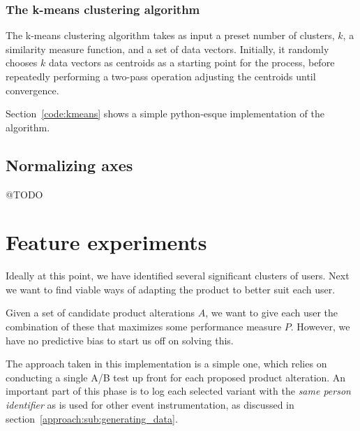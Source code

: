 \subsubsection{The k-means clustering algorithm}
\label{subs:kmeans}

The k-means clustering algorithm takes as input a preset number of clusters, $k$, a similarity measure function, and a set of data vectors. Initially, it randomly chooses $k$ data vectors as centroids as a starting point for the process, before repeatedly performing a two-pass operation adjusting the centroids until convergence.

Section~\ref{code:kmeans} shows a simple python-esque implementation of the algorithm.

%
%

\subsection{Normalizing axes}
\label{approach:sub:normalizing_axes}

@TODO

\section{Feature experiments}
\label{approach:sec:feature_experiments}

Ideally at this point, we have identified several significant clusters of users. Next we want to find viable ways of adapting the product to better suit each user.

Given a set of candidate product alterations $A$, we want to give each user the combination of these that maximizes some performance measure $P$. However, we have no predictive bias to start us off on solving this.

The approach taken in this implementation is a simple one, which relies on conducting a single A/B test up front for each proposed product alteration. An important part of this phase is to log each selected variant with the \emph{same person identifier} as is used for other event instrumentation, as discussed in section~\ref{approach:sub:generating_data}.



